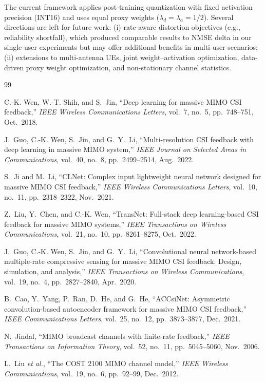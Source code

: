 \documentclass[conference]{IEEEtran}
\begin{document}
The current framework applies post-training quantization with fixed activation precision (INT16) and uses equal proxy weights ($\lambda_d=\lambda_a=1/2$). Several directions are left for future work: (i) rate-aware distortion objectives (e.g., reliability shortfall), which produced comparable results to NMSE delta in our single-user experiments but may offer additional benefits in multi-user scenarios; (ii) extensions to multi-antenna UEs, joint weight--activation optimization, data-driven proxy weight optimization, and non-stationary channel statistics.
\begin{thebibliography}{99}

C.-K. Wen, W.-T. Shih, and S.~Jin,
``Deep learning for massive MIMO CSI feedback,''
\emph{IEEE Wireless Communications Letters}, vol.~7, no.~5, pp.~748--751, Oct.~2018.

J.~Guo, C.-K. Wen, S.~Jin, and G.~Y.~Li,
``Multi-resolution CSI feedback with deep learning in massive MIMO system,''
\emph{IEEE Journal on Selected Areas in Communications}, vol.~40, no.~8, pp.~2499--2514, Aug.~2022.

S.~Ji and M.~Li,
``CLNet: Complex input lightweight neural network designed for massive MIMO CSI feedback,''
\emph{IEEE Wireless Communications Letters}, vol.~10, no.~11, pp.~2318--2322, Nov.~2021.

Z.~Liu, Y.~Chen, and C.-K. Wen,
``TransNet: Full-stack deep learning-based CSI feedback for massive MIMO systems,''
\emph{IEEE Transactions on Wireless Communications}, vol.~21, no.~10, pp.~8261--8275, Oct.~2022.

J.~Guo, C.-K. Wen, S.~Jin, and G.~Y.~Li,
``Convolutional neural network-based multiple-rate compressive sensing for massive MIMO CSI feedback: Design, simulation, and analysis,''
\emph{IEEE Transactions on Wireless Communications}, vol.~19, no.~4, pp.~2827--2840, Apr.~2020.

B.~Cao, Y.~Yang, P.~Ran, D.~He, and G.~He,
``ACCsiNet: Asymmetric convolution-based autoencoder framework for massive MIMO CSI feedback,''
\emph{IEEE Communications Letters}, vol.~25, no.~12, pp.~3873--3877, Dec.~2021.

N.~Jindal,
``MIMO broadcast channels with finite-rate feedback,''
\emph{IEEE Transactions on Information Theory}, vol.~52, no.~11, pp.~5045--5060, Nov.~2006.


L.~Liu \emph{et al.},
``The COST 2100 MIMO channel model,''
\emph{IEEE Wireless Communications}, vol.~19, no.~6, pp.~92--99, Dec.~2012.


\end{thebibliography}
\end{document}

